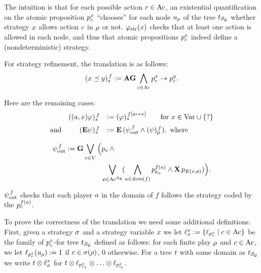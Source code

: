 The intuition is that for each possible action $\mov\in\Mov$, an
existential quantification on the atomic proposition $p_{\mov}^{\var}$
``chooses'' for each  node $\noeud_{\fplay}$ of the tree 
$\unfold[\KS_{\CGS}]{\sstate_{{\pos_0}}}$ whether strategy $\var$
allows action $\mov$ in $\fplay$ or not. 
$\phistrat$  checks that at least one action is allowed in each
node, and thus that atomic propositions
$p_{\mov}^{\var}$ indeed define a (nondeterministic) strategy.

For strategy refinement, the translation is as follows:
\[\tr[f]{\var \refines \varb} \egdef \A\always\biget_{\mov\in\Mov} p_\mov^\var
  \impl p_\mov^{\varb}.\]

Here are the remaining cases:
\[
\begin{array}{lrl}
& \tr[f]{\bind{\var}\phi}	& \egdef \tr[{f[\ag\mapsto \var]}]{\phi} \quad\quad
                          \text{for }\var\in\Varf\union\{\unb\}  \\[5pt]
\mbox{and} & \tr[f]{\Eout\psi}	& \egdef \E\,(\psiout[f] \wedge
                                 \trp[f]{\psi}), \mbox{ where}
\end{array}
\]

\begin{align*}
\psiout[f]  \egdef \always
  \bigou_{\pos\in\setpos}\Big( & p_{\pos}\, \et  \\
  & \bigou_{\jmov\in\Mov^{\Agf}} 
  (\biget_{\ag\in\dom(f)}p_{\jmov_{\ag}}^{f(\ag)}\et \X\,
                          p_{\trans(\pos,\jmov)}) \Big ).  
\end{align*}

                      
$\psiout[f]$ checks that  each player $\ag$ in the domain of $f$
follows the strategy coded by the $p_\act^{f(\ag)}$. 

   
To prove the correctness of the translation we need some additional
definitions. First, given a strategy $\strat$ and
a strategy variable $\var$ we
let  $\stratlab{\var}\egdef\{\plab[{p_\act^\var}]\mid
\act\in\Act\}$ be the family of $p_\act^\var$- for tree
$\unfold[\KS_{\CGS}]{}$ defined as follows: for each
finite play $\fplay$ and $\act\in\Act$,
we let $\plab[{p_\act^\var}](\noeud_\fplay)\egdef1$ if $\act\in\strat(\fplay)$, 0 otherwise.
For a  tree $\ltree$ with same domain as
$\unfold[\KS_{\CGS}]{}$ we write $\ltree\prodlab \stratlab{\var}$ for
$\ltree\prodlab \plab[{p_{\act_1}^\var}]\prodlab\ldots\prodlab \plab[{p_{\act_\maxmov}^\var}]$.

